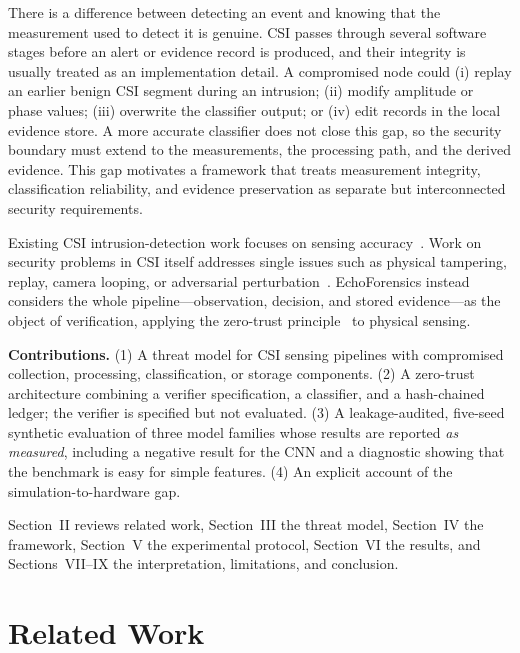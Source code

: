 \documentclass[conference]{IEEEtran}
\begin{document}
There is a difference between detecting an event and knowing that the measurement used to detect it is genuine. CSI passes through several software stages before an alert or evidence record is produced, and their integrity is usually treated as an implementation detail. A compromised node could (i) replay an earlier benign CSI segment during an intrusion; (ii) modify amplitude or phase values; (iii) overwrite the classifier output; or (iv) edit records in the local evidence store. A more accurate classifier does not close this gap, so the security boundary must extend to the measurements, the processing path, and the derived evidence. This gap motivates a framework that treats measurement integrity, classification reliability, and evidence preservation as separate but interconnected security requirements.

Existing CSI intrusion-detection work focuses on sensing accuracy~\cite{qian2014pads,wang2019wialarm,li2017aralarm}. Work on security problems in CSI itself addresses single issues such as physical tampering, replay, camera looping, or adversarial perturbation~\cite{dehmollaian2020,basha2024,lakshmanan2019surfi,gopalakrishnan2025,xu2022wicam,liu2024time}. EchoForensics instead considers the whole pipeline---observation, decision, and stored evidence---as the object of verification, applying the zero-trust principle~\cite{rose2020zta,syed2022zta} to physical sensing.

\textbf{Contributions.} (1) A threat model for CSI sensing pipelines with compromised collection, processing, classification, or storage components. (2) A zero-trust architecture combining a verifier specification, a classifier, and a hash-chained ledger; the verifier is specified but not evaluated. (3) A leakage-audited, five-seed synthetic evaluation of three model families whose results are reported \emph{as measured}, including a negative result for the CNN and a diagnostic showing that the benchmark is easy for simple features. (4) An explicit account of the simulation-to-hardware gap.

Section~II reviews related work, Section~III the threat model, Section~IV the framework, Section~V the experimental protocol, Section~VI the results, and Sections~VII--IX the interpretation, limitations, and conclusion.

\section{Related Work}
\end{document}
